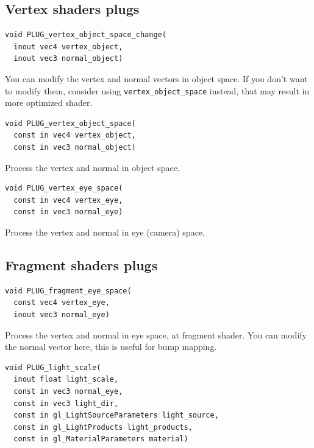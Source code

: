 \documentclass{acmsiggraph}                     %
\begin{document}
\subsection{Vertex shaders plugs}

\begin{Verbatim}[commandchars=\\\{\},frame=single]
void PLUG_vertex_object_space_change(
  inout vec4 vertex_object,
  inout vec3 normal_object)
\end{Verbatim}

You can modify the vertex and normal vectors in object space.
If you don't want to modify them, consider using \texttt{vertex\_object\_space}
instead, that may result in more optimized shader.

\begin{Verbatim}[commandchars=\\\{\},frame=single]
void PLUG_vertex_object_space(
  const in vec4 vertex_object,
  const in vec3 normal_object)
\end{Verbatim}

Process the vertex and normal in object space.

\begin{Verbatim}[commandchars=\\\{\},frame=single]
void PLUG_vertex_eye_space(
  const in vec4 vertex_eye,
  const in vec3 normal_eye)
\end{Verbatim}

Process the vertex and normal in eye (camera) space.

\subsection{Fragment shaders plugs}

\begin{Verbatim}[commandchars=\\\{\},frame=single]
void PLUG_fragment_eye_space(
  const vec4 vertex_eye,
  inout vec3 normal_eye)
\end{Verbatim}

Process the vertex and normal in eye space, at fragment shader.
You can modify the normal vector here, this is useful for bump mapping.

\begin{Verbatim}[commandchars=\\\{\},frame=single]
void PLUG_light_scale(
  inout float light_scale,
  const in vec3 normal_eye,
  const in vec3 light_dir,
  const in gl_LightSourceParameters light_source,
  const in gl_LightProducts light_products,
  const in gl_MaterialParameters material)
\end{Verbatim}
\end{document}
